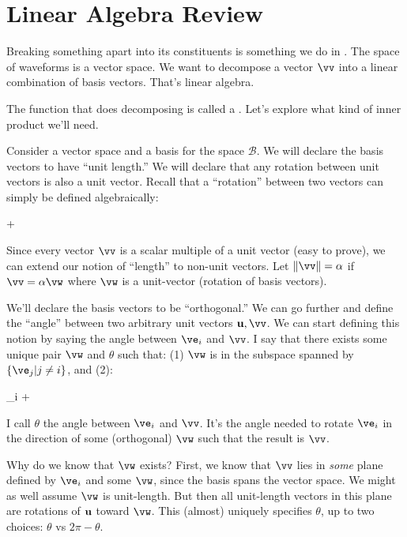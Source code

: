 \section{Linear Algebra Review}

Breaking something apart into its constituents is something we do in
. The space of waveforms is a vector space. We
want to decompose a vector $\vv$ into a linear combination of basis
vectors. That's linear algebra.

The function that does decomposing is called a .
Let's explore what kind of inner product we'll need.

Consider a vector space and a basis for the space $\mathcal{B}$. We will
declare the basis vectors to have ``unit length.'' We will declare that
any rotation between unit vectors is also a unit vector. Recall that a
``rotation'' between two vectors can simply be defined algebraically:

\begin{nedqn}
  \cos\theta \vu + \sin\theta \vv
\end{nedqn}

Since every vector $\vv$ is a scalar multiple of a unit vector (easy to
prove), we can extend our notion of ``length'' to non-unit vectors. Let
$\norm{\vv} = \alpha$ if $\vv = \alpha \vw$ where $\vw$ is a unit-vector
(rotation of basis vectors).

We'll declare the basis vectors to be ``orthogonal.'' We can go further
and define the ``angle'' between two arbitrary unit vectors $\vu, \vv$.
We can start defining this notion by saying the angle between $\ve_i$
and $\vv$. I say that there exists some unique pair $\vw$ and $\theta$
such that: (1) $\vw$ is in the subspace spanned by $\setof{\ve_j | j \ne
i}$, and (2):

\begin{nedqn}
  \vv
\eqcol
  \cos\theta \ve_i + \sin\theta \vw
\end{nedqn}

\noindent
I call $\theta$ the angle between $\ve_i$ and $\vv$. It's the angle
needed to rotate $\ve_i$ in the direction of some (orthogonal) $\vw$
such that the result is $\vv$.

Why do we know that $\vw$ exists? First, we know that $\vv$ lies in
\emph{some} plane defined by $\ve_i$ and some $\vw$, since the basis
spans the vector space. We might as well assume $\vw$ is unit-length.
But then all unit-length vectors in this plane are rotations of $\bm{\mathrm{u}}$
toward $\vw$. This (almost) uniquely specifies $\theta$, up to two
choices: $\theta$ vs $2\pi - \theta$.

